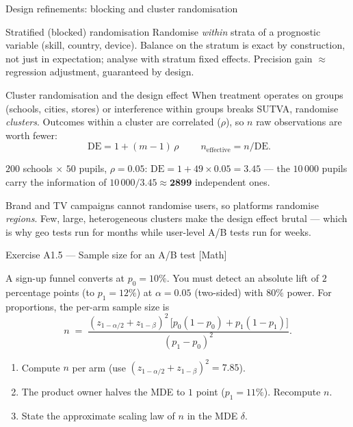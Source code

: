 \documentclass[aspectratio=169,11pt]{beamer}
\begin{document}
\begin{frame}{Design refinements: blocking and cluster randomisation}
  \begin{block}{Stratified (blocked) randomisation}
    Randomise \emph{within} strata of a prognostic variable (skill, country, device).
    Balance on the stratum is exact by construction, not just in expectation; analyse
    with stratum fixed effects. Precision gain $\approx$ regression adjustment,
    guaranteed by design.
  \end{block}
  \begin{block}{Cluster randomisation and the design effect}
    When treatment operates on groups (schools, cities, stores) or interference within
    groups breaks SUTVA, randomise \emph{clusters}. Outcomes within a cluster are
    correlated ($\rho$), so $n$ raw observations are worth fewer:
    \[
      \boxed{\;\mathrm{DE} = 1 + (m-1)\,\rho\;}
      \qquad n_{\text{effective}} = n / \mathrm{DE}.
    \]
  \end{block}
  \begin{numexample}
    $200$ schools $\times$ $50$ pupils, $\rho = 0.05$:
    $\mathrm{DE} = 1 + 49 \times 0.05 = \mathbf{3.45}$ --- the $10\,000$ pupils carry the
    information of $10\,000/3.45 \approx \mathbf{2899}$ independent ones.
  \end{numexample}
  \begin{industry}
    Brand and TV campaigns cannot randomise users, so platforms randomise \emph{regions}.
    Few, large, heterogeneous clusters make the design effect brutal --- which is why geo
    tests run for months while user-level A/B tests run for weeks.
  \end{industry}
\end{frame}

\begin{frame}{Exercise A1.5 --- Sample size for an A/B test [Math]}
\begin{exercise}
  A sign-up funnel converts at $p_0 = 10\%$. You must detect an absolute lift of
  $2$ percentage points (to $p_1 = 12\%$) at $\alpha = 0.05$ (two-sided) with $80\%$
  power. For proportions, the per-arm sample size is
  \[
    n \;=\; \frac{(z_{1-\alpha/2}+z_{1-\beta})^2\,\big[p_0(1-p_0) + p_1(1-p_1)\big]}{(p_1-p_0)^2}.
  \]
  \begin{enumerate}
    \item Compute $n$ per arm (use $(z_{1-\alpha/2}+z_{1-\beta})^2 = 7.85$).
    \item The product owner halves the MDE to $1$ point ($p_1 = 11\%$). Recompute $n$.
    \item State the approximate scaling law of $n$ in the MDE $\delta$.
  \end{enumerate}
\end{exercise}
\end{frame}
\end{document}
